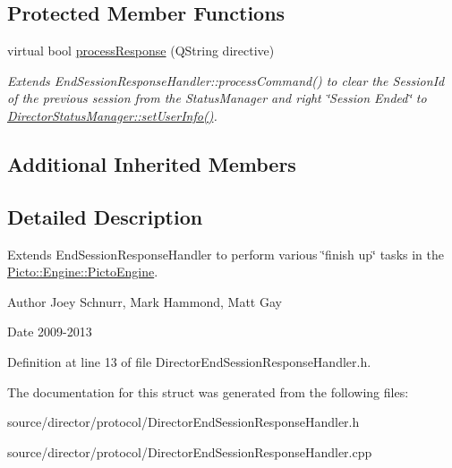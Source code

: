 \subsection*{Protected Member Functions}
\begin{DoxyCompactItemize}
\item 
\hypertarget{struct_director_end_session_response_handler_a2686e1427340a7d44651e4eee09812a9}{virtual bool \hyperlink{struct_director_end_session_response_handler_a2686e1427340a7d44651e4eee09812a9}{process\-Response} (Q\-String directive)}\label{struct_director_end_session_response_handler_a2686e1427340a7d44651e4eee09812a9}

\begin{DoxyCompactList}\small\item\em Extends End\-Session\-Response\-Handler\-::process\-Command() to clear the Session\-Id of the previous session from the Status\-Manager and right \char`\"{}\-Session Ended\char`\"{} to \hyperlink{class_director_status_manager_a10d0fc15364fa73814c90c9c5300708c}{Director\-Status\-Manager\-::set\-User\-Info()}. \end{DoxyCompactList}\end{DoxyCompactItemize}
\subsection*{Additional Inherited Members}


\subsection{Detailed Description}
Extends End\-Session\-Response\-Handler to perform various \char`\"{}finish up\char`\"{} tasks in the \hyperlink{class_picto_1_1_engine_1_1_picto_engine}{Picto\-::\-Engine\-::\-Picto\-Engine}. 

\begin{DoxyAuthor}{Author}
Joey Schnurr, Mark Hammond, Matt Gay 
\end{DoxyAuthor}
\begin{DoxyDate}{Date}
2009-\/2013 
\end{DoxyDate}


Definition at line 13 of file Director\-End\-Session\-Response\-Handler.\-h.



The documentation for this struct was generated from the following files\-:\begin{DoxyCompactItemize}
\item 
source/director/protocol/Director\-End\-Session\-Response\-Handler.\-h\item 
source/director/protocol/Director\-End\-Session\-Response\-Handler.\-cpp\end{DoxyCompactItemize}
